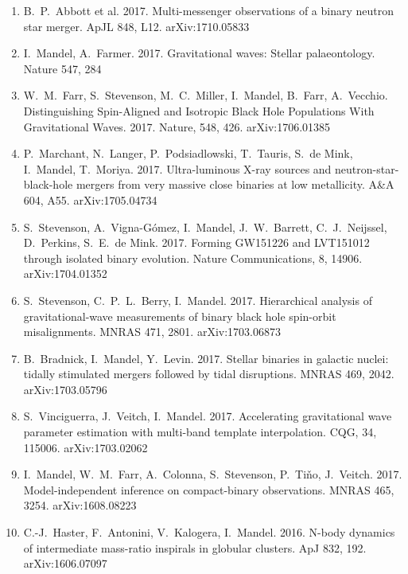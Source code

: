 \documentclass[margin,line]{res}
\begin{document}
\begin{resume}
\begin{enumerate}
\item B.~P.~Abbott et al. 2017. Multi-messenger observations of a binary neutron star merger. ApJL 848, L12. arXiv:1710.05833

\item I.~Mandel, A.~Farmer.  2017. Gravitational waves: Stellar palaeontology.  Nature 547, 284

\item W.~M.~Farr, S.~Stevenson, M.~C.~Miller, I.~Mandel, B.~Farr, A.~Vecchio.  Distinguishing Spin-Aligned and Isotropic Black Hole Populations With Gravitational Waves. 2017. Nature, 548, 426. arXiv:1706.01385

\item P.~Marchant, N.~Langer, P.~Podsiadlowski, T.~Tauris, S.~de Mink, I.~Mandel, T.~Moriya.  2017.  Ultra-luminous X-ray sources and neutron-star-black-hole mergers from very massive close binaries at low metallicity.  A\&A 604, A55.  arXiv:1705.04734

\item S.~Stevenson, A.~Vigna-G\'omez, I.~Mandel, J.~W.~Barrett, C.~J.~Neijssel, D.~Perkins, S.~E.~de Mink.  2017.  Forming GW151226 and LVT151012 through isolated binary evolution.  Nature Communications, 8,  14906.  arXiv:1704.01352

\item S.~Stevenson, C.~P.~L.~Berry, I.~Mandel.  2017.  Hierarchical analysis of gravitational-wave measurements of binary black hole spin-orbit misalignments.  MNRAS 471, 2801. arXiv:1703.06873

\item B.~Bradnick, I.~Mandel, Y.~Levin. 2017.  Stellar binaries in galactic nuclei: tidally stimulated mergers followed by tidal disruptions.  MNRAS 469, 2042.  arXiv:1703.05796

\item S.~Vinciguerra, J.~Veitch, I.~Mandel.  2017.  Accelerating gravitational wave parameter estimation with multi-band template interpolation.  CQG, 34, 115006.  arXiv:1703.02062

\item I.~Mandel, W.~M.~Farr, A.~Colonna, S.~Stevenson, P.~Ti\v{n}o, J.~Veitch.  2017.  Model-independent inference on compact-binary observations.  MNRAS 465, 3254.  arXiv:1608.08223

\item C.-J.~Haster, F.~Antonini, V.~Kalogera, I.~Mandel. 2016. N-body dynamics of intermediate mass-ratio inspirals in globular clusters. ApJ 832, 192.  arXiv:1606.07097


\end{enumerate}
\end{resume}
\end{document}
